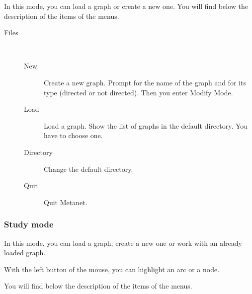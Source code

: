 \documentclass[11pt]{article}
\begin{document}
In this mode, you can load a graph or create a new one.
You will find below the description of the items of the menus.
\newpage
\begin{description}
\item[Files]\ 
\begin{description}
  \item[New] Create a new graph. Prompt for the name of the graph and
	for its type (directed or not directed).
	Then you enter Modify Mode.
  \item[Load] Load a graph. Show the list of graphs in the default 
	directory. You have to choose one.
  \item[Directory] Change the default directory.
  \item[Quit] Quit Metanet.
\end{description}
\end{description}

\subsubsection{Study mode}

In this mode, you can load a graph, create a new one or work with an
already loaded graph.

With the left button of the mouse, you can highlight an arc or a node.

You will find below the description of the items of the menus.
\end{document}
